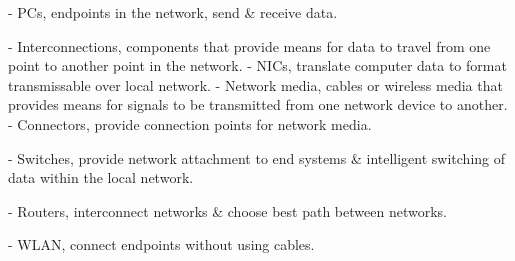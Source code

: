 \item - PCs, endpoints in the network, send \& receive data.
\lskip
\item - Interconnections, components that provide means for data to travel from one point to another point in the network.
\itemitem - NICs, translate computer data to format transmissable over local network.
\itemitem - Network media, cables or wireless media that provides means for signals to be transmitted from one network device to another.
\itemitem - Connectors, provide connection points for network media.
\item - Switches, provide network attachment to end systems \& intelligent switching of data within the local network.
\item - Routers, interconnect networks \& choose best path between networks.
\item - WLAN, connect endpoints without using cables.

\bye
